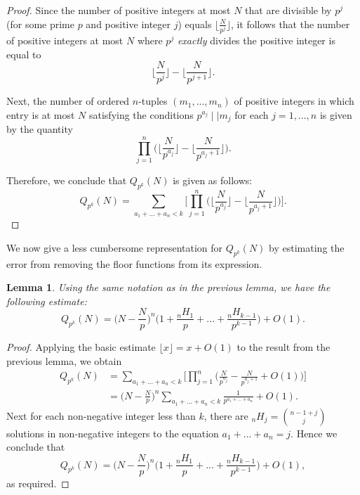 \documentclass[10pt,a4paper]{article}
\newtheorem{lemma}[theorem]{Lemma}
\theoremstyle{definition}
\theoremstyle{remark}
\begin{document}
\begin{proof}
Since the number of positive integers at most $N$ that are divisible by $p^j$ (for some prime $p$ and positive integer $j$) equals $\lfloor\frac{N}{p^j}\rfloor$, it follows that the number of positive integers at most $N$ where $p^j$ \textit{exactly} divides the positive integer is equal to
$$\Big\lfloor\frac{N}{p^j}\Big\rfloor - \Big\lfloor\frac{N}{p^{j+1}}\Big\rfloor.$$

\noindent Next, the number of ordered $n$-tuples $(m_1, ..., m_n)$ of positive integers in which entry is at most $N$ satisfying the conditions $p^{a_j} \mid\mid m_j$ for each $j = 1, ..., n$ is given by the quantity
$$\prod_{j=1}^n \Big(\Big\lfloor\frac{N}{p^{a_j}}\Big\rfloor - \Big\lfloor\frac{N}{p^{a_j+1}}\Big\rfloor\Big).$$

\noindent Therefore, we conclude that $Q_{p^k}(N)$ is given as follows:
$$Q_{p^k}(N) = \sum_{a_1+...+a_n < k} \Big[\prod_{j=1}^n \Big(\Big\lfloor \frac{N}{p^{a_j}}\Big\rfloor - \Big\lfloor \frac{N}{p^{a_j + 1}}\Big\rfloor\Big)\Big].$$
\end{proof}

We now give a less cumbersome representation for $Q_{p^k}(N)$ by estimating the error from removing the floor functions from its expression.

\begin{lemma}
Using the same notation as in the previous lemma, we have the following estimate:
$$Q_{p^k}(N) = \Big(N - \frac{N}{p}\Big)^n \Big(1 + \frac{{}_nH_1}{p} + ... + \frac{{}_nH_{k-1}}{p^{k-1}}\Big) + O(1).$$
\end{lemma}

\begin{proof}
Applying the basic estimate $\lfloor x \rfloor  = x + O(1)$ to the result from the previous lemma, we obtain
\begin{align*} Q_{p^k}(N) &= \sum_{a_1+...+a_n < k} \Big[\prod_{j=1}^n \Big( \frac{N}{p^{a_j}} - \frac{N}{p^{a_j + 1}} + O(1)\Big)\Big]\\ &= \Big(N - \frac{N}{p}\Big)^n \sum_{a_1+...+a_n < k} \frac{1}{p^{a_1 + ... + a_n}} + O(1). \end{align*} 
\noindent Next for each non-negative integer less than $k$, there are ${}_nH_j = \binom{n-1+j}{j}$ solutions in non-negative integers to the equation $a_1+...+a_n = j$. Hence we conclude that
$$Q_{p^k}(N) = \Big(N - \frac{N}{p}\Big)^n \Big(1 + \frac{{}_nH_1}{p} + ... + \frac{{}_nH_{k-1}}{p^{k-1}}\Big) + O(1),$$
as required.
\end{proof}
\end{document}
